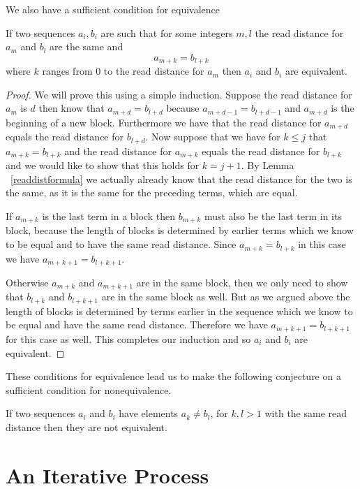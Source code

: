 \documentclass[runningheads,a4paper]{llncs}
\begin{document}
We also have a sufficient condition for equivalence 
\begin{lemma} If two sequences $a_i, b_i$ are such that for some integers $m,l$ the read distance for $a_m$ and $b_l$ are the same and 
\begin{equation*}
a_{m+k} = b_{l+k}
\end{equation*}
where $k$ ranges from 0 to the read distance for $a_m$ then $a_i$ and $b_i$ are equivalent. 
\end{lemma}
\begin{proof}
We will prove this using a simple induction. Suppose the read distance for $a_m$ is $d$ then know that $a_{m+d} = b_{l+d}$ because $a_{m+d-1} = b_{l+d-1}$ and $a_{m+d}$ is the beginning of a new block. Furthermore we have that the read distance for $a_{m+d}$ equals the read distance for $b_{l+d}$. Now suppose that we have for $k \leq j$ that $a_{m+k} = b_{l+k}$ and the read distance for $a_{m+k}$ equals the read distance for $b_{l+k}$ and we would like to show that this holds for $k = j+1$. By Lemma ~\ref{readdistformula} we actually already know that the read distance for the two is the same, as it is the same for the preceding terms, which are equal.

If $a_{m+k}$ is the last term in a block then $b_{m+k}$ must also be the last term in its block, because the length of blocks is determined by earlier terms which we know to be equal and to have the same read distance. Since $a_{m+k} = b_{l+k}$  in this case we have $a_{m+k+1} = b_{l+k+1}$. 

Otherwise $a_{m+k}$ and $a_{m+k+1}$ are in the same block, then we only need to show that $b_{l+k}$ and $b_{l+k+1}$ are in the same block as well. But as we argued above the length of blocks is determined by terms earlier in the sequence which we know to be equal and have the same read distance. Therefore we have $a_{m+k+1} = b_{l+k+1}$ for this case as well. This completes our induction and so $a_i$ and $b_i$ are equivalent. 
\end{proof}
These conditions for equivalence lead us to make the following conjecture on a sufficient condition for nonequivalence.

\begin{conjecture} If two sequences $a_i$ and $b_i$ have elements $a_k \neq b_l$, for $k,l>1$ with the same read distance then they are not equivalent. 
\end{conjecture}

\section{An Iterative Process}
\label{iterativeprocess}
\end{document}

